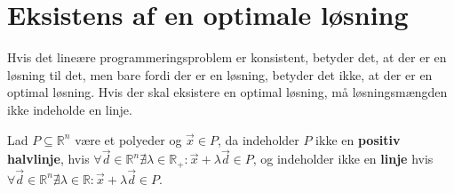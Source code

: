 \section{Eksistens af en optimale løsning}
\label{sec:eksistens}
Hvis det lineære programmeringsproblem er konsistent, betyder det, at der er en løsning til det, men bare fordi der er en løsning, betyder det ikke, at der er en optimal løsning.
Hvis der skal eksistere en optimal løsning, må løsningsmængden ikke indeholde en linje.
%

\begin{defn} [Linje]
Lad $P\subseteq \mathds{R}^n $ være et polyeder og $\vec{x} \in P$, da indeholder $P$ ikke en \textbf{positiv halvlinje}, hvis $\forall \vec{d} \in \mathds{R}^n \nexists \lambda \in \mathds{R}_+ : \vec{x}+\lambda \vec{d} \in P$, og indeholder ikke en \textbf{linje} hvis $\forall \vec{d} \in \mathds{R}^n \nexists \lambda \in \mathds{R} : \vec{x}+\lambda \vec{d} \in P$.
\label{def:linje}
\end{defn}

